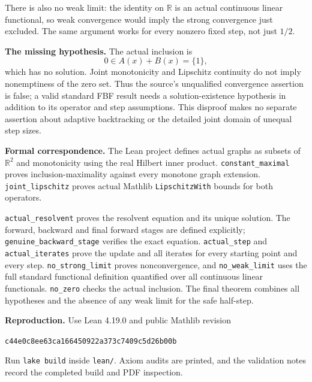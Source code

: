 \documentclass[11pt]{article}
\begin{document}
There is also no weak limit: the identity on $\mathbb R$ is an actual
continuous linear functional, so weak convergence would imply the
strong convergence just excluded. The same argument works for every
nonzero fixed step, not just $1/2$.

\textbf{The missing hypothesis.}
The actual inclusion is
\[
 0\in A(x)+B(x)=\{1\},
\]
which has no solution. Joint monotonicity and Lipschitz continuity
do not imply nonemptiness of the zero set. Thus the source's unqualified
convergence assertion is false; a valid standard FBF result needs a
solution-existence hypothesis in addition to its operator and step
assumptions. This disproof makes no separate assertion about
adaptive backtracking or the detailed joint domain of unequal step sizes.

\textbf{Formal correspondence.}
The Lean project defines actual graphs as subsets of $\mathbb R^2$
and monotonicity using the real Hilbert inner product.
\texttt{constant\_maximal} proves inclusion-maximality against every
monotone graph extension. \texttt{joint\_lipschitz} proves actual
Mathlib \texttt{LipschitzWith} bounds for both operators.

\texttt{actual\_resolvent} proves the resolvent equation and its unique
solution. The forward, backward and final forward stages are defined
explicitly; \texttt{genuine\_backward\_stage} verifies the exact equation.
\texttt{actual\_step} and \texttt{actual\_iterates} prove the update and
all iterates for every starting point and every step.
\texttt{no\_strong\_limit} proves nonconvergence, and
\texttt{no\_weak\_limit} uses the full standard functional definition
quantified over all continuous linear functionals.
\texttt{no\_zero} checks the actual inclusion. The final theorem combines
all hypotheses and the absence of any weak limit for the safe half-step.

\textbf{Reproduction.}
Use Lean 4.19.0 and public Mathlib revision
\begin{center}\small\texttt{c44e0c8ee63ca166450922a373c7409c5d26b00b}\end{center}
Run \texttt{lake build} inside \texttt{lean/}. Axiom audits are printed,
and the validation notes record the completed build and PDF inspection.
\end{document}
